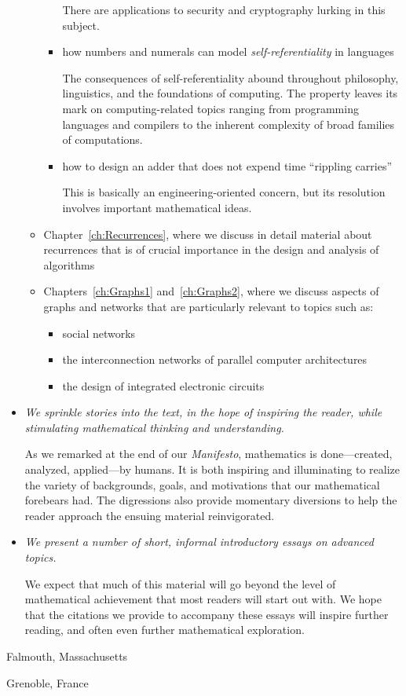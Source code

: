 \begin{itemize}
\begin{itemize}
\begin{itemize}
\smallskip

There are applications to security and cryptography lurking in this subject.
     \item
how numbers and numerals can model {\em self-referentiality} in languages

\smallskip

The consequences of self-referentiality abound throughout philosophy, linguistics, and the foundations of computing.  The property leaves its mark on computing-related topics ranging from programming languages and compilers to the inherent complexity of broad families of computations.
     \item
how to design an adder that does not expend time ``rippling carries''

\smallskip

This is basically an engineering-oriented concern, but its resolution involves important mathematical ideas.
     \end{itemize}
  \item
Chapter~\ref{ch:Recurrences}, where we discuss in detail material about recurrences that is of crucial importance in the design and analysis of algorithms
  \item
Chapters~\ref{ch:Graphs1} and~\ref{ch:Graphs2}, where we discuss aspects of graphs and networks that are particularly relevant to topics such as:
     \begin{itemize}
     \item
social networks
     \item
the interconnection networks of parallel computer architectures
     \item
the design of integrated electronic circuits
     \end{itemize}
  \end{itemize}

\item
{\em We sprinkle stories into the text, in the hope of inspiring the reader, while stimulating mathematical thinking and understanding.}

\smallskip

As we remarked at the end of our {\it Manifesto}, mathematics is done---created, analyzed, applied---by humans.  It is both inspiring and illuminating to realize the variety of backgrounds, goals, and motivations that our mathematical forebears had.  The digressions also provide momentary diversions to help the reader approach the ensuing material reinvigorated.

\item
{\em We present a number of short, informal introductory essays on advanced topics.}

\smallskip

We expect that much of this material will go beyond the level of mathematical achievement that most readers will start out with.  We hope that the citations we provide to accompany these essays will inspire further reading, and often even further mathematical exploration.
\end{itemize}

\bigskip

\hfill Falmouth, Massachusetts

\hfill Grenoble, France



